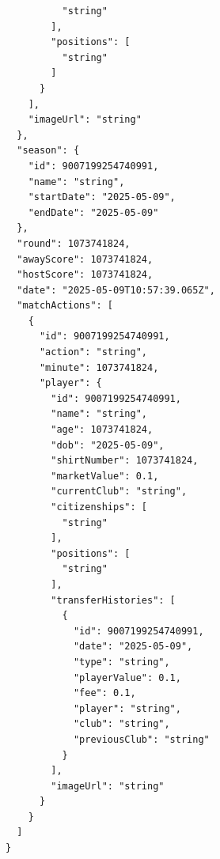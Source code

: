 \documentclass[../BTL.tex]{subfiles}
\begin{document}
\begin{itemize}
\begin{verbatim}
          "string"
        ],
        "positions": [
          "string"
        ]
      }
    ],
    "imageUrl": "string"
  },
  "season": {
    "id": 9007199254740991,
    "name": "string",
    "startDate": "2025-05-09",
    "endDate": "2025-05-09"
  },
  "round": 1073741824,
  "awayScore": 1073741824,
  "hostScore": 1073741824,
  "date": "2025-05-09T10:57:39.065Z",
  "matchActions": [
    {
      "id": 9007199254740991,
      "action": "string",
      "minute": 1073741824,
      "player": {
        "id": 9007199254740991,
        "name": "string",
        "age": 1073741824,
        "dob": "2025-05-09",
        "shirtNumber": 1073741824,
        "marketValue": 0.1,
        "currentClub": "string",
        "citizenships": [
          "string"
        ],
        "positions": [
          "string"
        ],
        "transferHistories": [
          {
            "id": 9007199254740991,
            "date": "2025-05-09",
            "type": "string",
            "playerValue": 0.1,
            "fee": 0.1,
            "player": "string",
            "club": "string",
            "previousClub": "string"
          }
        ],
        "imageUrl": "string"
      }
    }
  ]
}
        \end{verbatim}
\end{itemize}
\end{document}
